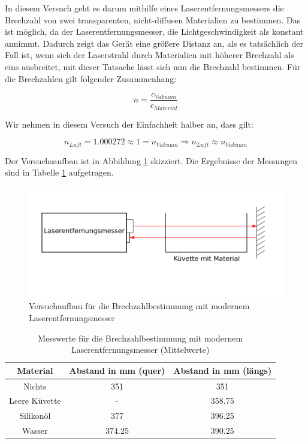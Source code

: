 In diesem Versuch geht es darum mithilfe eines Laserentfernungsmessers die Brechzahl von zwei transparenten, nicht-diffusen Materialien zu bestimmen. Das ist möglich, da der Laserentfernungsmesser, die Lichtgeschwindigkeit als konstant annimmt. Dadurch zeigt das Gerät eine größere Distanz an, als es tatsächlich der Fall ist, wenn sich der Laserstrahl durch Materialien mit höherer Brechzahl als eins ausbreitet, mit dieser Tatsache lässt sich nun die Brechzahl bestimmen. Für die Brechzahlen gilt folgender Zusammenhang:

\begin{equation}
    n = \frac{c_{Vakuum}}{c_{Material}}
\end{equation}

Wir nehmen in diesem Versuch der Einfachheit halber an, dass gilt:

\begin{equation}
    n_{Luft} = 1.000272 \approx 1 = n_{Vakuum} \Rightarrow n_{Luft} \approx n_{Vakuum}
\end{equation}

Der Versuchsaufbau ist in Abbildung \ref{fig:Laserentfernungsmesser} skizziert. Die Ergebnisse der Messungen sind in Tabelle \ref{tab:Messwerte Versuch 3 Lichtgeschwindigkeit} aufgetragen.

\begin{figure}[h]
    \centering
    \includegraphics[scale=0.6]{./fig/Laserentfernungsmesser.png}
    \caption{Versuchaufbau für die Brechzahlbestimmung mit modernem Laserentfernungsmesser}
    \label{fig:Laserentfernungsmesser}
\end{figure}

\begin{table}
    \centering
    \caption{Messwerte für die Brechzahlbestimmung mit modernem Laserentfernungsmesser (Mittelwerte)}
    \begin{tabular}{c c c}
    \hline
    Material & Abstand in mm (quer) & Abstand in mm (längs) \\
    \hline
    Nichts & 351 & 351 \\
    Leere Küvette & - & 358.75 \\
    Silikonöl & 377 & 396.25 \\
    Wasser & 374.25 & 390.25 \\
    \hline
    \end{tabular}
    \label{tab:Messwerte Versuch 3 Lichtgeschwindigkeit}
\end{table}

